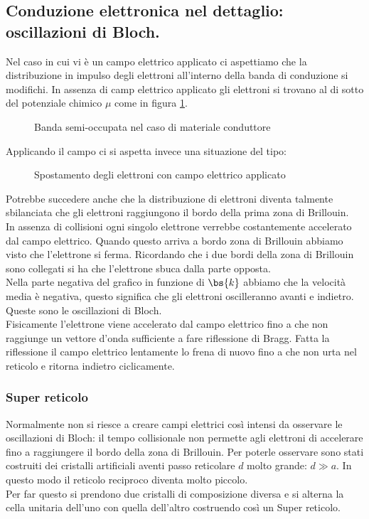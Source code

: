 \subsection{Conduzione elettronica nel dettaglio: oscillazioni di Bloch.}
\label{subsec:Conduzione elettronica nel dettaglio.}
Nel caso in cui vi è un campo elettrico applicato ci aspettiamo che la distribuzione in impulso degli elettroni all'interno della banda di conduzione si modifichi. In assenza di camp elettrico applicato gli elettroni si trovano al di sotto del potenziale chimico $\mu$ come in figura \ref{fig:banda-semi-occupata-nel-caso-di-materiale-conduttore}.
\begin{figure}[H]
    \centering
    \caption{Banda semi-occupata nel caso di materiale conduttore}
    \label{fig:banda-semi-occupata-nel-caso-di-materiale-conduttore}
\end{figure}
\noindent
Applicando il campo ci si aspetta invece una situazione del tipo:
\begin{figure}[H]
    \centering
    \caption{Spostamento degli elettroni con campo elettrico applicato}
    \label{fig:spostamento-degli-elettroni-con-campo-elettrico-applicato}
\end{figure}
\noindent
Potrebbe succedere anche che la distribuzione di elettroni diventa talmente sbilanciata che gli elettroni raggiungono il bordo della prima zona di Brillouin.\\
In assenza di collisioni ogni singolo elettrone verrebbe costantemente accelerato dal campo elettrico. Quando questo arriva a bordo zona di Brillouin abbiamo visto che l'elettrone si ferma. Ricordando che i due bordi della zona di Brillouin sono collegati si ha che l'elettrone sbuca dalla parte opposta.\\
Nella parte negativa del grafico in funzione di $\bs{k}$ abbiamo che la velocità media è negativa, questo significa che gli elettroni oscilleranno avanti e indietro. Queste sono le oscillazioni di Bloch.\\
Fisicamente l'elettrone viene accelerato dal campo elettrico fino a che non raggiunge un vettore d'onda sufficiente a fare riflessione di Bragg. Fatta la riflessione il campo elettrico lentamente lo frena di nuovo fino a che non urta nel reticolo e ritorna indietro ciclicamente. 
\subsubsection{Super reticolo}
\label{subsubsec:Super reticolo}
Normalmente non si riesce a creare campi elettrici così intensi da osservare le oscillazioni di Bloch: il tempo  collisionale non permette agli elettroni di accelerare fino a raggiungere il bordo della zona di Brillouin.
Per poterle osservare sono stati costruiti dei cristalli artificiali aventi passo reticolare $d$ molto grande: $d \gg a$. In questo modo il reticolo reciproco diventa molto piccolo. \\
Per far questo si prendono due cristalli di composizione diversa e si alterna la cella unitaria dell'uno con quella dell'altro costruendo così un Super reticolo.

